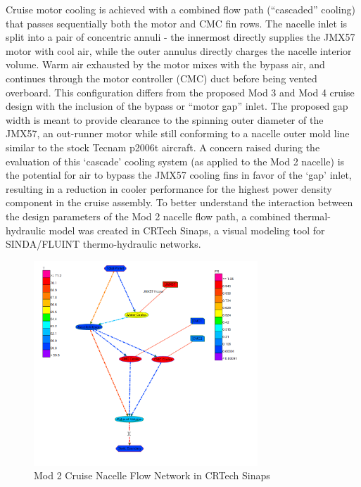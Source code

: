 \documentclass[]{aiaa-tc}%
\begin{document}
Cruise motor cooling is achieved with a combined flow path (“cascaded” cooling) that passes sequentially both the motor and CMC fin rows.  The nacelle inlet is split into a pair of concentric annuli - the innermost directly supplies the JMX57 motor with cool air, while the outer annulus directly charges the nacelle interior volume.  Warm air exhausted by the motor mixes with the bypass air, and continues through the motor controller (CMC) duct before being vented overboard.  
This configuration differs from the proposed Mod 3 and Mod 4 cruise design with the inclusion of the bypass or “motor gap” inlet.  The proposed gap width is meant to provide clearance to the spinning outer diameter of the JMX57, an out-runner motor while still conforming to a nacelle outer mold line similar to the stock Tecnam p2006t aircraft. 
A concern raised during the evaluation of this ‘cascade’ cooling system (as applied to the Mod 2 nacelle) is the potential for air to bypass the JMX57 cooling fins in favor of the ‘gap’ inlet, resulting in a reduction in cooler performance for the highest power density component in the cruise assembly.  
To better understand the interaction between the design parameters of the Mod 2 nacelle flow path, a combined thermal-hydraulic model was created in CRTech Sinaps, a visual modeling tool for SINDA/FLUINT thermo-hydraulic networks. 

\begin{figure}[!htb]%
	\centering
	\includegraphics[width=0.75\textwidth]{figures/sinaps_paramsweep.PNG}
	\caption{Mod 2 Cruise Nacelle Flow Network in CRTech Sinaps}
	\label{fig:Sinaps}
\end{figure}
\end{document}
